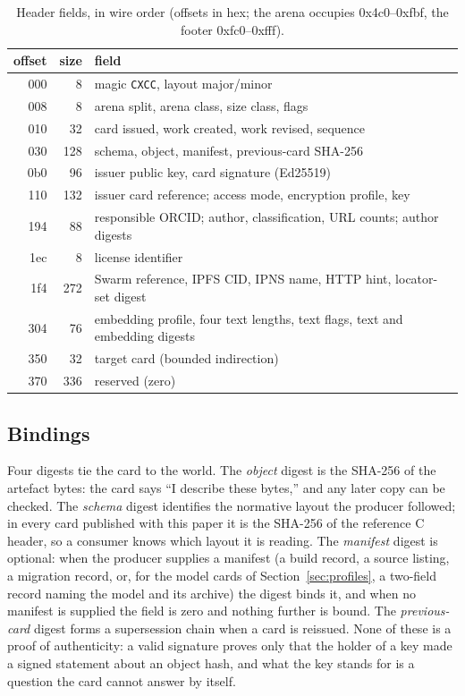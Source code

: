 \documentclass[sigconf]{acmart}
\begin{document}
\begin{table}[t]
\caption{Header fields, in wire order (offsets in hex; the arena occupies
0x4c0--0xfbf, the footer 0xfc0--0xfff).}
\label{tab:layout}
\footnotesize
\begin{tabular}{@{}rrp{}@{}}
\toprule
offset & size & field \\
\midrule
000 & 8   & magic \texttt{CXCC}, layout major/minor \\
008 & 8   & arena split, arena class, size class, flags \\
010 & 32  & card issued, work created, work revised, sequence \\
030 & 128 & schema, object, manifest, previous-card SHA-256 \\
0b0 & 96  & issuer public key, card signature (Ed25519) \\
110 & 132 & issuer card reference; access mode, encryption profile, key \\
194 & 88  & responsible ORCID; author, classification, URL counts; author digests \\
1ec & 8   & license identifier \\
1f4 & 272 & Swarm reference, IPFS CID, IPNS name, HTTP hint, locator-set digest \\
304 & 76  & embedding profile, four text lengths, text flags, text and embedding digests \\
350 & 32  & target card (bounded indirection) \\
370 & 336 & reserved (zero) \\
\bottomrule
\end{tabular}
\end{table}

\subsection{Bindings}
\label{sec:bindings}

Four digests tie the card to the world. The \emph{object} digest is the SHA-256
of the artefact bytes: the card says ``I describe these bytes,'' and any later
copy can be checked. The \emph{schema} digest identifies the normative layout
the producer followed; in every card published with this paper it is the
SHA-256 of the reference C header, so a consumer knows which layout it is
reading. The \emph{manifest} digest is optional: when the producer supplies a
manifest (a build record, a source listing, a migration record, or, for the
model cards of Section~\ref{sec:profiles}, a two-field record naming the
model and its archive) the digest binds it, and when no manifest is supplied
the field is zero and nothing further is bound. The \emph{previous-card}
digest forms a supersession chain when a card is reissued. None of these is a
proof of authenticity: a valid signature proves only that the holder of a key
made a signed statement about an object hash, and what the key stands for is
a question the card cannot answer by itself.
\end{document}
